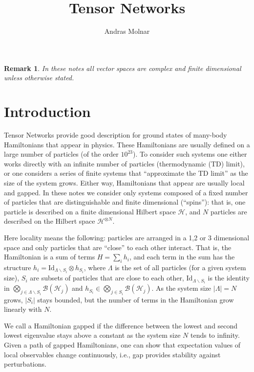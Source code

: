 \documentclass{article}
\title{Tensor Networks}
\author{Andras Molnar}
\newtheorem{remark}{Remark}
\newcommand{\id}{\mathrm{Id}}
\begin{document}
\maketitle

\begin{remark}
	In these notes all vector spaces are complex and finite dimensional unless otherwise stated.
\end{remark}


\section{Introduction}

Tensor Networks provide good description for ground states of many-body Hamiltonians that appear in physics. These Hamiltonians are usually defined on a large number of particles (of the order $10^{23}$). To consider such systems one either works directly with an infinite number of particles (thermodynamic (TD) limit), or one considers a series of finite systems that ``approximate the TD limit'' as the size of the system grows. Either way, Hamiltonians that appear are usually local and gapped. In these notes we consider only systems composed of a fixed number of particles that are distinguishable and finite dimensional (``spins''): that is, one particle is described on a finite dimensional Hilbert space $\mathcal{H}$, and $N$ particles are described on the Hilbert space $\mathcal{H}^{\otimes N}$. 

Here locality means the following: particles are arranged in a 1,2 or 3 dimensional space and only particles that are ``close'' to each other interact. That is, the Hamiltonian is a sum of terms $H = \sum_i h_i$, and each term in the sum has the structure $h_i = \id_{\Lambda\backslash S_i} \otimes h_{S_i}$, where $\Lambda$ is the set of all particles (for a given system size), $S_i$ are subsets of particles that are close to each other, $\id_{\Lambda\backslash S_i}$ is the identity in $\bigotimes_{j \in \Lambda\backslash S_i}\mathcal{B}(\mathcal{H}_j)$ and $h_{S_i}\in\bigotimes_{j\in S_i} \mathcal{B}(\mathcal{H}_j)$. As the system size $|\Lambda| = N$ grows, $|S_i|$ stays bounded, but the number of terms in the Hamiltonian grow linearly with $N$.

We call a Hamiltonian gapped if the difference between the lowest and second lowest eigenvalue stays above a constant as the system size $N$ tends to infinity. Given a path of gapped Hamiltonians, one can show that expectation values of local observables change continuously, i.e., gap provides stability against perturbations. 
\end{document}
